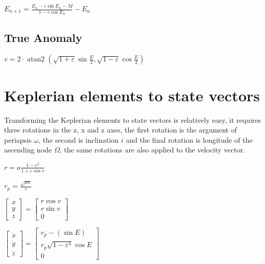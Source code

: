 \documentclass{article}
\DeclareMathOperator{\atantwo}{atan2}
\begin{document}
$ E_{n+1} = \frac{E_n - \varepsilon \sin{E_n} - M }{1 - \varepsilon \cos{E_n}}-E_n $

\subsection{True Anomaly}

$ v = 2 \cdot \atantwo(\sqrt{1+\varepsilon} \sin{\frac{E}{2}}, \sqrt{1-\varepsilon} \cos{\frac{E}{2}}) $

\section{Keplerian elements to state vectors}

Transforming the Keplerian elements to state vectors is relatively easy, it requires three rotations in the z, x and z axes, the first rotation is the argument of periapsis $\omega$, the second is inclination $i$ and the final rotation is longitude of the ascending node $\Omega$, the same rotations are also applied to the velocity vector.

$ r = a \frac{1-\varepsilon^2}{1+\varepsilon \cos{v}} $

$ r_p = \frac{\sqrt{\mu a}}{r} $

$ \begin{bmatrix}
	x \\
	y \\
	z
\end{bmatrix} = 
\begin{bmatrix}
	r \cos{v} \\
	r \sin{v} \\
	0
\end{bmatrix}$

$ \begin{bmatrix}
	\dot{x} \\
	\dot{y} \\
	\dot{z}
\end{bmatrix} =
\begin{bmatrix}
	r_p -(\sin{E}) \\
	r_p \sqrt{1-\varepsilon^2} \cos{E} \\
	0
\end{bmatrix}$
\end{document}
